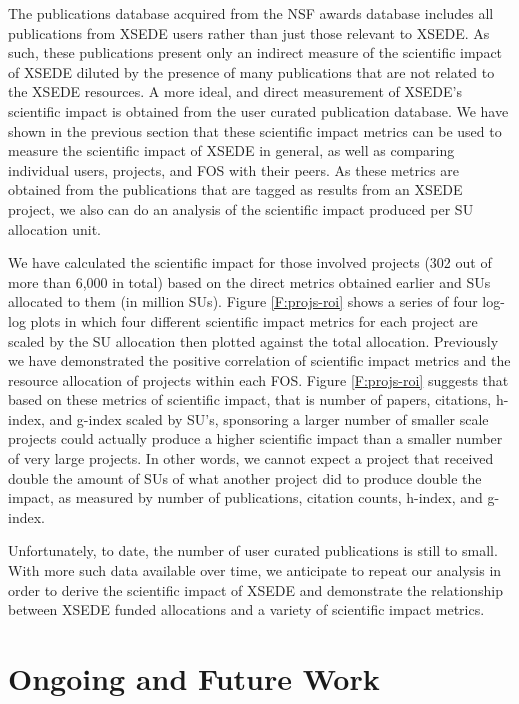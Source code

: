 \documentclass{sig-alternate}
\begin{document}
The publications database acquired from the NSF awards database
includes all publications from XSEDE users rather than just those
relevant to XSEDE. As such, these publications present only an
indirect measure of the scientific impact of XSEDE diluted by the
presence of many publications that are not related to the XSEDE
resources. A more ideal, and direct measurement of XSEDE's scientific
impact is obtained from the user curated publication database. We have
shown in the previous section that these scientific impact metrics can
be used to measure the scientific impact of XSEDE in general, as well
as comparing individual users, projects, and FOS with their peers. As
these metrics are obtained from the publications that are tagged as
results from an XSEDE project, we also can do an analysis of the
scientific impact produced per SU allocation unit.

We have calculated the scientific impact for those involved projects
(302 out of more than 6,000 in total) based on the direct metrics
obtained earlier and SUs allocated to them (in million SUs). Figure
\ref{F:projs-roi} shows a series of four log-log plots in which four
different scientific impact metrics for each project are scaled by the
SU allocation then plotted against the total allocation. Previously we
have demonstrated the positive correlation of scientific impact
metrics and the resource allocation of projects within each
FOS. Figure \ref{F:projs-roi} suggests that based on these metrics of
scientific impact, that is number of papers, citations, h-index, and
g-index scaled by SU's, sponsoring a larger number of smaller scale
projects could actually produce a higher scientific impact than a
smaller number of very large projects. In other words, we cannot
expect a project that received double the amount of SUs of what
another project did to produce double the impact, as measured by
number of publications, citation counts, h-index, and g-index.

Unfortunately, to date, the number of user curated publications is
still to small. With more such data available over time, we anticipate
to repeat our analysis in order to derive the scientific impact of
XSEDE and demonstrate the relationship between XSEDE funded
allocations and a variety of scientific impact metrics.

\section{Ongoing and Future Work} \label{S:futurework}
\end{document}
